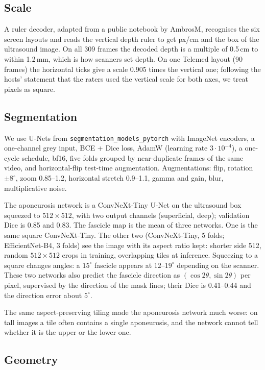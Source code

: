 \documentclass[11pt,a4paper]{article}
\begin{document}
\subsection{Scale}

A ruler decoder, adapted from a public notebook by AmbrosM, recognises the six screen layouts and reads the vertical depth ruler to get px/cm and the box of the ultrasound image. On all 309 frames the decoded depth is a multiple of 0.5\,cm to within 1.2\,mm, which is how scanners set depth. On one Telemed layout (90 frames) the horizontal ticks give a scale 0.905 times the vertical one; following the hosts' statement that the raters used the vertical scale for both axes, we treat pixels as square.

\subsection{Segmentation}

We use U-Nets from \texttt{segmentation\_models\_pytorch} with ImageNet encoders, a one-channel grey input, BCE + Dice loss, AdamW (learning rate $3\cdot10^{-4}$), a one-cycle schedule, bf16, five folds grouped by near-duplicate frames of the same video, and horizontal-flip test-time augmentation. Augmentations: flip, rotation $\pm8^\circ$, zoom 0.85--1.2, horizontal stretch 0.9--1.1, gamma and gain, blur, multiplicative noise.

The aponeurosis network is a ConvNeXt-Tiny U-Net on the ultrasound box squeezed to $512\times512$, with two output channels (superficial, deep); validation Dice is 0.85 and 0.83. The fascicle map is the mean of three networks. One is the same square ConvNeXt-Tiny. The other two (ConvNeXt-Tiny, 5 folds; EfficientNet-B4, 3 folds) see the image with its aspect ratio kept: shorter side 512, random $512\times512$ crops in training, overlapping tiles at inference. Squeezing to a square changes angles: a $15^\circ$ fascicle appears at $12$--$19^\circ$ depending on the scanner. These two networks also predict the fascicle direction as $(\cos 2\theta, \sin 2\theta)$ per pixel, supervised by the direction of the mask lines; their Dice is 0.41--0.44 and the direction error about $5^\circ$.

The same aspect-preserving tiling made the aponeurosis network much worse: on tall images a tile often contains a single aponeurosis, and the network cannot tell whether it is the upper or the lower one.

\subsection{Geometry}
\end{document}
